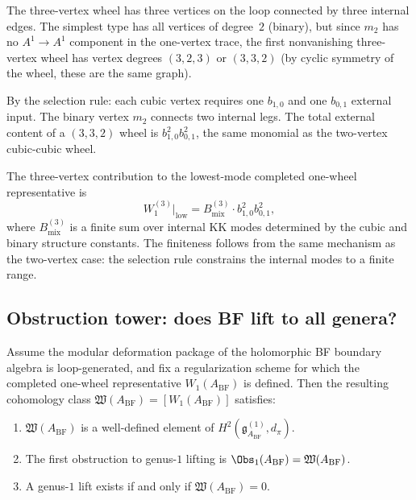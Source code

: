 \begin{computation}
The three-vertex wheel has three vertices on the loop connected by three internal edges.
The simplest type has all vertices of degree~$2$ (binary), but since $m_2$ has no
$A^1 \to A^1$ component in the one-vertex trace, the first nonvanishing three-vertex
wheel has vertex degrees $(3, 2, 3)$ or $(3, 3, 2)$ (by cyclic symmetry of the wheel,
these are the same graph).

By the selection rule: each cubic vertex requires one $b_{1,0}$ and one $b_{0,1}$
external input. The binary vertex $m_2$ connects two internal legs. The total
external content of a $(3,3,2)$ wheel is $b_{1,0}^2 b_{0,1}^2$, the same monomial
as the two-vertex cubic-cubic wheel.

The three-vertex contribution to the lowest-mode completed one-wheel
representative is
\begin{equation}
W_1^{(3)}\big|_{\mathrm{low}} = B_{\mathrm{mix}}^{(3)} \cdot b_{1,0}^2 b_{0,1}^2,
\end{equation}
where $B_{\mathrm{mix}}^{(3)}$ is a finite sum over internal KK modes determined by the
cubic and binary structure constants. The finiteness follows from the same mechanism
as the two-vertex case: the selection rule constrains the internal modes to a finite
range.
\end{computation}

\subsection{Obstruction tower: does BF lift to all genera?}

\begin{theorem}
Assume the modular deformation package of the holomorphic BF boundary algebra is
loop-generated, and fix a regularization scheme for which the completed one-wheel
representative $W_1(A_{\mathrm{BF}})$ is defined. Then the resulting cohomology
class $\mathfrak{W}(A_{\mathrm{BF}}) = [W_1(A_{\mathrm{BF}})]$ satisfies:
\begin{enumerate}[label=\textup{(\roman*)}]
\item $\mathfrak{W}(A_{\mathrm{BF}})$ is a well-defined element of
 $H^2(\mathfrak{g}^{(1)}_{A_{\mathrm{BF}}}, d_\pi)$.
\item The first obstruction to genus-$1$ lifting is
 $\Obs_1(A_{\mathrm{BF}}) = \mathfrak{W}(A_{\mathrm{BF}})$.
\item A genus-$1$ lift exists if and only if $\mathfrak{W}(A_{\mathrm{BF}}) = 0$.
\end{enumerate}
\end{theorem}

